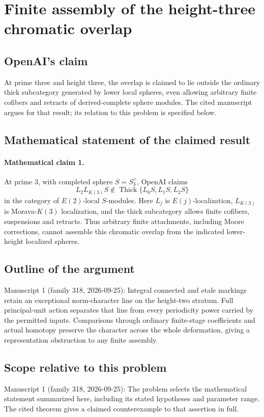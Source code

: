 \documentclass[11pt]{article}
\begin{document}
\section*{Finite assembly of the height-three chromatic overlap}

\subsection{OpenAI's claim}
At prime three and height three, the overlap is claimed to lie outside the ordinary thick subcategory generated by lower local spheres, even allowing arbitrary finite cofibers and retracts of derived-complete sphere modules. The cited manuscript argues for that result; its relation to this problem is specified below.

\subsection{Mathematical statement of the claimed result}
\paragraph{Mathematical claim 1.} At prime $3$, with completed sphere $S=S_3^\wedge$, OpenAI claims
\[
L_2L_{K(3)}S\notin\operatorname{Thick}\{L_0S,L_1S,L_2S\}
\]
in the category of $E(2)$-local $S$-modules. Here $L_j$ is $E(j)$-localization, $L_{K(3)}$ is Morava-$K(3)$ localization, and the thick subcategory allows finite cofibers, suspensions and retracts. Thus arbitrary finite attachments, including Moore corrections, cannot assemble this chromatic overlap from the indicated lower-height localized spheres.

\subsection{Outline of the argument}
Manuscript 1 (family 318, 2026-09-25): Integral connected and etale markings retain an exceptional norm-character line on the height-two stratum. Full principal-unit action separates that line from every periodicity power carried by the permitted inputs. Comparisons through ordinary finite-stage coefficients and actual homotopy preserve the character across the whole deformation, giving a representation obstruction to any finite assembly.

\subsection{Scope relative to this problem}
Manuscript 1 (family 318, 2026-09-25): The problem selects the mathematical statement summarized here, including its stated hypotheses and parameter range. The cited theorem gives a claimed counterexample to that assertion in full.
\end{document}
